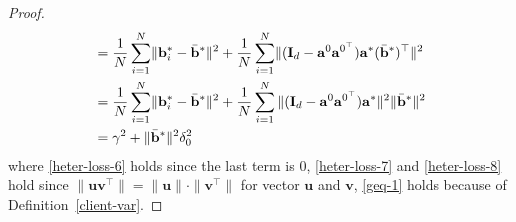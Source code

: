 \documentclass{article}
\theoremstyle{plain}
\theoremstyle{definition}
\theoremstyle{remark}
\begin{document}
\begin{proof}
\begin{align}
        & = \frac{1}{N} \sum_{i=1}^{N} \lVert \mathbf{b}_i^*-\Bar{
        \mathbf{b}}^*\rVert^2 + \frac{1}{N} \sum_{i=1}^{N} \lVert(\mathbf{I}_d-\mathbf{a}^0\mathbf{a}^{0^\top})\mathbf{a}^*(\Bar{\mathbf{b}}^*)^\top \rVert^2  \label{heter-loss-7}\\
        & = \frac{1}{N} \sum_{i=1}^{N} \lVert \mathbf{b}_i^*-\Bar{
        \mathbf{b}}^*\rVert^2 + \frac{1}{N} \sum_{i=1}^{N} \| (\mathbf{I}_d-\mathbf{a}^0\mathbf{a}^{0^\top})\mathbf{a}^*\|^2 \|\Bar{\mathbf{b}}^* \|^2  \label{heter-loss-8}\\
        &=\gamma^2 +\|\Bar{\mathbf{b}}^* \|^2 \delta_0^2 \label{geq-1}
    \end{align} 
    where \eqref{heter-loss-6} holds since the last term is 0, \eqref{heter-loss-7} and \eqref{heter-loss-8} hold since $\|\mathbf{u}\mathbf{v}^\top\|=\|\mathbf{u}\|\cdot \|\mathbf{v}^\top \|$ for vector $\mathbf{u}$ and $\mathbf{v}$, \eqref{geq-1} holds because of Definition~\ref{client-var}.
\end{proof}
\end{document}
